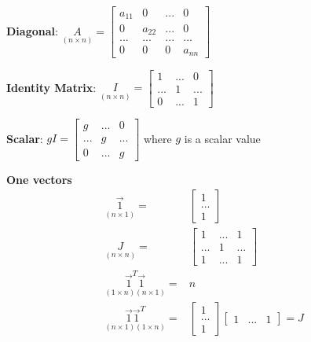 \documentclass[11pt]{article}
\begin{document}
\begin{enumerate}
\textbf{Diagonal}: \(\underset{(n \times n)}A = \begin{bmatrix}
a_{11} & 0 & ... & 0\\
0 & a_{22} & ... & 0\\
... & ... & ... & ...\\
0 & 0 & 0 & a_{nn}
\end{bmatrix}\)

\textbf{Identity Matrix}: \(\underset{(n \times n)}I = \begin{bmatrix}
1 & ... & 0\\
... & 1 & ...\\
0 & ... & 1
\end{bmatrix}\)

\textbf{Scalar}: \(gI = \begin{bmatrix}
g & ... & 0\\
... & g & ...\\
0 & ... & g
\end{bmatrix}\) where \(g\) is a scalar value


\textbf{One vectors}
\begin{equation}
\begin{split}
\underset{(n \times 1)}{\vec{1}} = & \begin{bmatrix}
1\\
...\\
1
\end{bmatrix}\\
\underset{(n \times n)} J = & \begin{bmatrix}
1 & ... & 1\\
... & 1 & ...\\
1 & ... & 1
\end{bmatrix}\\
\underset{(1 \times n)(n \times 1)}{\vec{1}^T \vec{1}} = & n\\
\underset{(n \times 1)(1 \times n)}{\vec{1} \vec{1}^T} = & \begin{bmatrix}
1\\
...\\
1
\end{bmatrix} \begin{bmatrix}
1 & ... & 1
\end{bmatrix} = J
\end{split}
\end{equation}


\end{enumerate}
\end{document}
